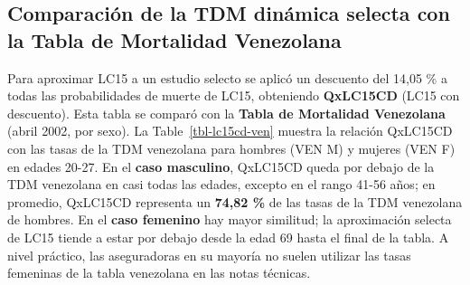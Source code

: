 \documentclass[
  11pt,
  a4paper,
]{article}
\begin{document}
\subsection{Comparación de la TDM dinámica selecta con la Tabla de
Mortalidad
Venezolana}\label{comparaciuxf3n-de-la-tdm-dinuxe1mica-selecta-con-la-tabla-de-mortalidad-venezolana}

Para aproximar LC15 a un estudio selecto se aplicó un descuento del
14,05 \% a todas las probabilidades de muerte de LC15, obteniendo
\textbf{QxLC15CD} (LC15 con descuento). Esta tabla se comparó con la
\textbf{Tabla de Mortalidad Venezolana} (abril 2002, por sexo). La
Table~\ref{tbl-lc15cd-ven} muestra la relación QxLC15CD con las tasas de
la TDM venezolana para hombres (VEN M) y mujeres (VEN F) en edades
20-27. En el \textbf{caso masculino}, QxLC15CD queda por debajo de la
TDM venezolana en casi todas las edades, excepto en el rango 41-56 años;
en promedio, QxLC15CD representa un \textbf{74,82 \%} de las tasas de la
TDM venezolana de hombres. En el \textbf{caso femenino} hay mayor
similitud; la aproximación selecta de LC15 tiende a estar por debajo
desde la edad 69 hasta el final de la tabla. A nivel práctico, las
aseguradoras en su mayoría no suelen utilizar las tasas femeninas de la
tabla venezolana en las notas técnicas.
\end{document}
